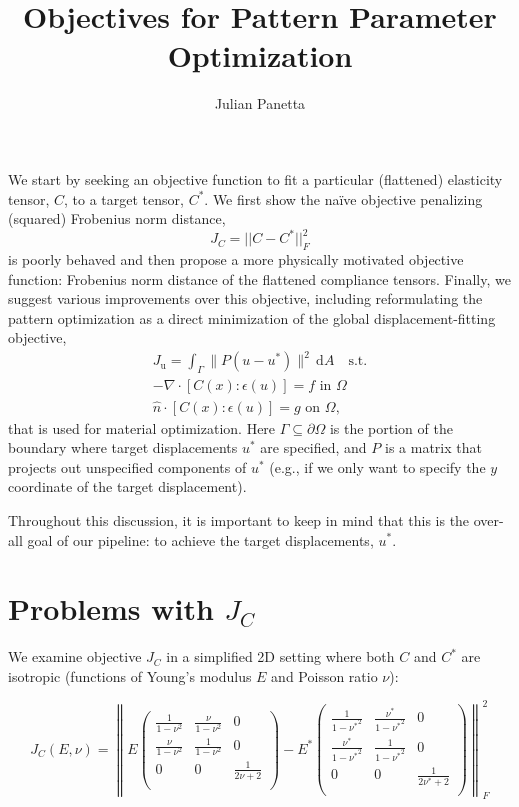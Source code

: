 \documentclass[10pt]{article}
\title{Objectives for Pattern Parameter Optimization}
\author{Julian Panetta}
\providecommand{\norm}[1]{\lVert#1\rVert}
\providecommand{\dA}{\, \mathrm{d}A}
\begin{document}
\maketitle

We start by seeking an objective function to fit a
particular (flattened) elasticity tensor, $C$, to a target tensor, $C^*$.
We first show the na\"ive objective penalizing (squared) Frobenius norm
distance, $$J_C = ||C - C^*||^2_F$$ is poorly behaved and then propose a more
physically motivated objective function: Frobenius norm distance of the
flattened compliance tensors. Finally, we suggest various improvements over this objective,
including reformulating the pattern optimization as a direct minimization of
the global displacement-fitting objective,
\begin{equation}
\begin{aligned}
\label{eqn:main_objective}
J_\text{u} = \int_{\Gamma} \norm{P(u - u^*)}^2 \dA \quad \text{s.t.} \\
-\nabla \cdot [C(x) : \epsilon(u)] = f \text{ in } \Omega \\
\hat{n} \cdot [C(x) : \epsilon(u)] = g \text{ on } \Omega,
\end{aligned}
\end{equation}
that is used for material optimization. Here $\Gamma \subseteq \partial \Omega$
is the portion of the boundary where target displacements $u^*$ are specified,
and $P$ is a matrix that projects out unspecified components of $u^*$ (e.g., if
we only want to specify the $y$ coordinate of the target displacement).

Throughout this discussion, it is important to keep in mind that this is the
over-all goal of our pipeline: to achieve the target displacements, $u^*$.

\section{Problems with $J_C$}
We examine objective $J_C$ in a simplified 2D setting where both $C$ and
$C^*$ are isotropic (functions of Young's modulus $E$ and Poisson ratio $\nu$):

$$
J_C(E, \nu) =
    \left\lVert
    E
    \left(
    \begin{array}{ccc}
     \frac{1}{1-\nu ^2} & \frac{\nu }{1-\nu ^2} & 0 \\
     \frac{\nu }{1-\nu ^2} & \frac{1}{1-\nu ^2} & 0 \\
     0 & 0 & \frac{1}{2 \nu +2} \\
    \end{array}
    \right) -
    E^*
    \left(
    \begin{array}{ccc}
     \frac{1}{1-{\nu^*} ^2} & \frac{{\nu^*} }{1-{\nu^*} ^2} & 0 \\
     \frac{{\nu^*} }{1-{\nu^*} ^2} & \frac{1}{1-{\nu^*} ^2} & 0 \\
     0 & 0 & \frac{1}{2 {\nu^*} +2} \\
    \end{array}
    \right)
    \right\rVert^2_F
$$
\end{document}
